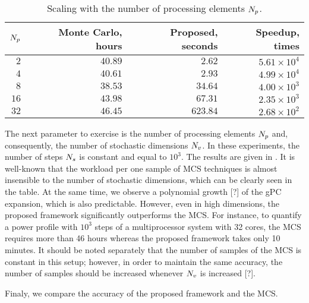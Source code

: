 \begin{table}
  \centering
  \caption{Scaling with the number of processing elements ${N_p}$.}
  \vspace{-10pt}
  \begin{tabular}{|r|r|r|r|}
    \hline
    ${N_p}$ & Monte Carlo, hours & Proposed, seconds & Speedup, times \\
    \hline
    $ 2$ & $40.89$ & $  2.62$ & $5.61 \times 10^4$ \\
    $ 4$ & $40.61$ & $  2.93$ & $4.99 \times 10^4$ \\
    $ 8$ & $38.53$ & $ 34.64$ & $4.00 \times 10^3$ \\
    $16$ & $43.98$ & $ 67.31$ & $2.35 \times 10^3$ \\
    $32$ & $46.45$ & $623.84$ & $2.68 \times 10^2$ \\
    \hline
  \end{tabular}
  \vspace{-10pt}
\end{table}
The next parameter to exercise is the number of processing elements ${N_p}$ and, consequently, the number of stochastic dimensions ${N_v}$. In these experiments, the number of steps ${N_s}$ is constant and equal to $10^3$. The results are given in . It is well-known that the workload per one sample of MCS techniques is almost insensible to the number of stochastic dimensions, which can be clearly seen in the table. At the same time, we observe a polynomial growth [?] of the gPC expansion, which is also predictable. However, even in high dimensions, the proposed framework significantly outperforms the MCS. For instance, to quantify a power profile with $10^3$ steps of a multiprocessor system with 32 cores, the MCS requires more than 46 hours whereas the proposed framework takes only 10 minutes. It should be noted separately that the number of samples of the MCS is constant in this setup; however, in order to maintain the same accuracy, the number of samples should be increased whenever ${N_v}$ is increased [?].

Finaly, we compare the accuracy of the proposed framework and the MCS.
